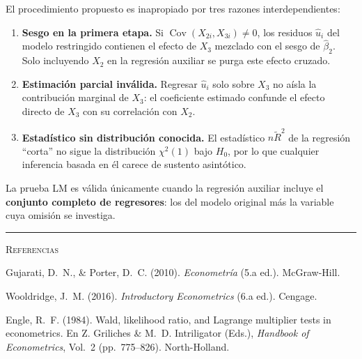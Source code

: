 \documentclass[12pt,letterpaper]{article}
\newcommand{\Cov}{\operatorname{Cov}}
\begin{document}
\begin{clave}

El procedimiento propuesto es inapropiado por tres razones
interdependientes:

\begin{enumerate}[leftmargin=1.8em]

\item \textbf{Sesgo en la primera etapa.} Si $\Cov(X_{2i}, X_{3i})
      \neq 0$, los residuos $\hat{u}_{i}$ del modelo restringido
      contienen el efecto de $X_{3}$ mezclado con el sesgo de
      $\hat{\beta}_{2}$. Solo incluyendo $X_{2}$ en la regresión
      auxiliar se purga este efecto cruzado.

\item \textbf{Estimación parcial inválida.} Regresar $\hat{u}_{i}$
      solo sobre $X_{3}$ no aísla la contribución marginal de
      $X_{3}$: el coeficiente estimado confunde el efecto directo
      de $X_{3}$ con su correlación con $X_{2}$.

\item \textbf{Estadístico sin distribución conocida.} El estadístico
      $n\tilde{R}^{2}$ de la regresión ``corta'' no sigue la
      distribución $\chi^{2}(1)$ bajo $H_{0}$, por lo que cualquier
      inferencia basada en él carece de sustento asintótico.

\end{enumerate}

La prueba LM es válida únicamente cuando la regresión auxiliar incluye
el \textbf{conjunto completo de regresores}: los del modelo original
más la variable cuya omisión se investiga.

\end{clave}

\vspace{12pt}

\noindent\rule{\linewidth}{0.4pt}

\vspace{10pt}

\begin{center}
\small\textsc{Referencias}
\end{center}

\vspace{6pt}

\noindent
Gujarati, D.~N., \& Porter, D.~C. (2010).
\textit{Econometría} (5.a ed.).
McGraw-Hill.

\vspace{6pt}

\noindent
Wooldridge, J.~M. (2016).
\textit{Introductory Econometrics} (6.a ed.).
Cengage.

\vspace{6pt}

\noindent
Engle, R.~F. (1984).
Wald, likelihood ratio, and Lagrange multiplier tests in econometrics.
En Z. Griliches \& M.~D. Intriligator (Eds.),
\textit{Handbook of Econometrics}, Vol.~2 (pp.\ 775--826).
North-Holland.
\end{document}

